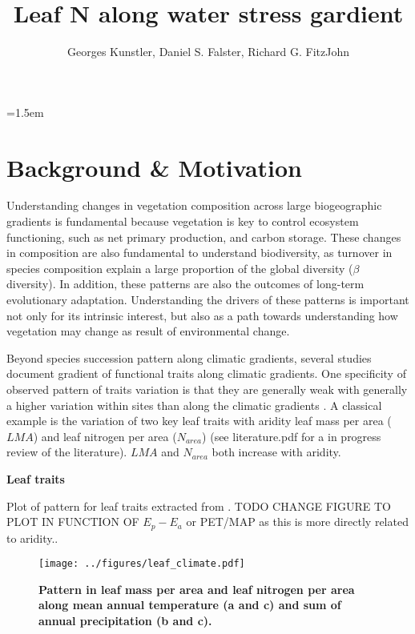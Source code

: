 \documentclass[a4paper,11pt]{article}
\title{Leaf N along water stress gardient}
\author{Georges Kunstler, Daniel S. Falster, Richard G. FitzJohn}
\date{}
\affiliation{Irstea Grenoble France}
\affiliation{Department of Biological Sciences, Macquarie University,
  Sydney, Australia}
\begin{document}
\mstitleshort
\parindent=1.5em
\addtolength{\parskip}{.3em}


\section{Background \& Motivation}


Understanding changes in vegetation composition across large biogeographic gradients is fundamental because vegetation is key to control ecosystem functioning, such as net primary production, and carbon storage. These changes in composition are also fundamental to understand biodiversity, as turnover in species composition explain a large proportion of the global diversity ($\beta$ diversity). In addition, these patterns are also the outcomes of long-term evolutionary adaptation. Understanding the drivers of these patterns is important not only for its intrinsic interest, but also as a path towards understanding how vegetation may change as result of environmental change.

Beyond species succession pattern along climatic gradients, several studies document gradient of functional traits along climatic gradients. One specificity of observed pattern of traits variation is that they are generally weak with generally a higher variation within sites than along the climatic gradients \citep[see][]{Wright-2004}. A classical example is the variation of two key leaf traits with aridity leaf mass per area ($LMA$) and leaf nitrogen per area ($N_{area}$) (see literature.pdf for a in progress review of the literature). $LMA$ \citep{Wright-2004,Onoda-2011,Moles-2014} and $N_{area}$ \citep{Wright-2005,Maire-2015} both increase with aridity. 

\clearpage


\textbf{Leaf traits} 

Plot of pattern for leaf traits extracted from \citep{Wright-2004}.
TODO CHANGE FIGURE TO PLOT IN FUNCTION OF $E_p - E_a$ or PET/MAP as this is more directly related to aridity..

\begin{figure}[ht]
\centering
\texttt{[image: ../figures/leaf\_climate.pdf]}
\caption{\textbf{Pattern in leaf mass per area and leaf nitrogen per area along mean annual temperature (a and c) and sum of annual precipitation (b and c).}%
\label{fig:leafpattern}}
\end{figure}
\end{document}
